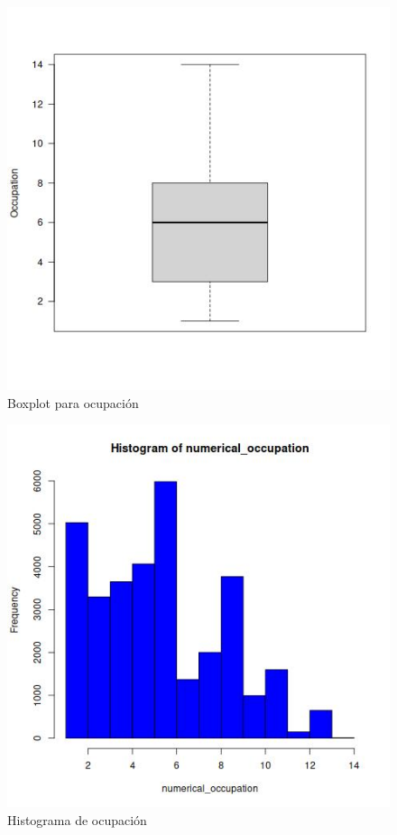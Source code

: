 \documentclass[10pt,twocolumn,a4paper]{article}
\begin{document}
\begin{figure}
    \includegraphics[width=\linewidth]{images/boxplot_occupation.jpeg}
    \caption{Boxplot para ocupación}
    \label{fig:boxplot_occupation}
\end{figure}

\begin{figure}
    \includegraphics[width=\linewidth]{images/hist_occupation.jpeg}
    \caption{Histograma de ocupación}
    \label{fig:hist_occupation}
\end{figure}
\end{document}
